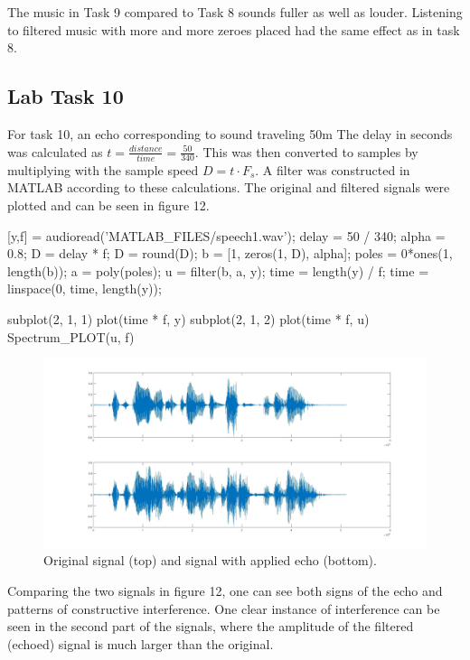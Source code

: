 \documentclass[a4paper,11pt]{article}
\begin{document}
The music in Task 9 compared to Task 8 sounds fuller as well as louder. Listening to filtered music with more and more zeroes placed had the same effect as in task 8. 

\subsection{Lab Task 10}
For task 10, an echo corresponding to sound traveling 50m 
The delay in seconds was calculated as $t = \frac{distance}{time} = \frac{50}{340}$. This was then converted to samples by multiplying with the sample speed $D = t \cdot F_s$. A filter was constructed in MATLAB according to these calculations. The original and filtered signals were plotted and can be seen in figure 12.
\begin{ffcode}
[y,f] = audioread('MATLAB_FILES/speech1.wav');
delay = 50 / 340;
alpha = 0.8;
D = delay * f;
D = round(D);
b = [1, zeros(1, D), alpha];
poles = 0*ones(1, length(b));
a = poly(poles);
u = filter(b, a, y);
time = length(y) / f;
time = linspace(0, time, length(y));

subplot(2, 1, 1)
plot(time * f, y)
subplot(2, 1, 2)
plot(time * f, u)
Spectrum_PLOT(u, f)
\end{ffcode}

\begin{figure}[H]
    \hspace{-40pt}\includegraphics[scale=0.28]{./images/Task10-Echo.jpg}
    \caption{Original signal (top) and signal with applied echo (bottom).}
    \label{fig:my_label}
\end{figure}

 

Comparing the two signals in figure 12, one can see both signs of the echo and patterns of constructive interference. One clear instance of interference can be seen in the second part of the signals, where the amplitude of the filtered (echoed) signal is much larger than the original.
\end{document}
